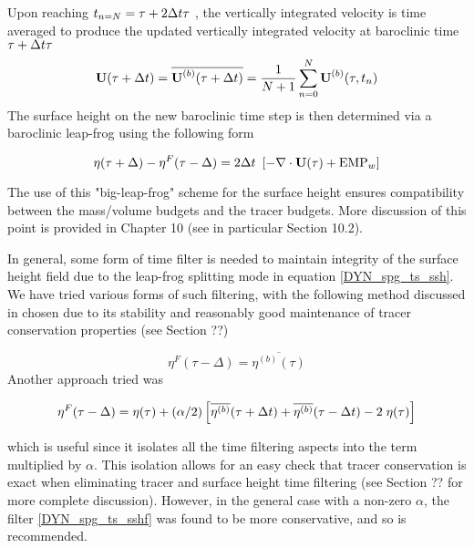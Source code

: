 \documentclass[NEMO_book]{subfiles}
\begin{document}
{Upon reaching $t_{n=N} = \tau + 2\Delta t \tau$ , the vertically integrated velocity is time averaged to produce the updated vertically integrated velocity at baroclinic time $\tau + \Delta t \tau$ 
\begin{equation} \label{DYN_spg_ts_u}
\textbf{U}(\tau+\Delta t) = \overline{\textbf{U}^{(b)}(\tau+\Delta t)} 
 	= \frac{1}{N+1} \sum\limits_{n=0}^N\textbf{U}^{(b)}(\tau,t_{n})
\end{equation}
The surface height on the new baroclinic time step is then determined via a baroclinic leap-frog using the following form 

\begin{equation} \label{DYN_spg_ts_ssh}
\eta(\tau+\Delta) - \eta^{F}(\tau-\Delta) = 2\Delta t \ \left[ - \nabla \cdot \textbf{U}(\tau) + \text{EMP}_w \right]  
\end{equation}

 The use of this "big-leap-frog" scheme for the surface height ensures compatibility between the mass/volume budgets and the tracer budgets. More discussion of this point is provided in Chapter 10 (see in particular Section 10.2). 
 
In general, some form of time filter is needed to maintain integrity of the surface 
height field due to the leap-frog splitting mode in equation \ref{DYN_spg_ts_ssh}. We 
have tried various forms of such filtering, with the following method discussed in 
\cite{Griffies_al_MWR01} chosen due to its stability and reasonably good maintenance of 
tracer conservation properties (see Section ??) 

\begin{equation} \label{DYN_spg_ts_sshf}
\eta^{F}(\tau-\Delta) =  \overline{\eta^{(b)}(\tau)} 
\end{equation}
Another approach tried was 

\begin{equation} \label{DYN_spg_ts_sshf2}
\eta^{F}(\tau-\Delta) = \eta(\tau) 
	+ (\alpha/2) \left[\overline{\eta^{(b)}}(\tau+\Delta t)
				    + \overline{\eta^{(b)}}(\tau-\Delta t) -2 \;\eta(\tau) \right]
\end{equation}

which is useful since it isolates all the time filtering aspects into the term multiplied 
by $\alpha$. This isolation allows for an easy check that tracer conservation is exact when 
eliminating tracer and surface height time filtering (see Section ?? for more complete discussion). However, in the general case with a non-zero $\alpha$, the filter \ref{DYN_spg_ts_sshf} was found to be more conservative, and so is recommended. 

}            %
\end{document}
